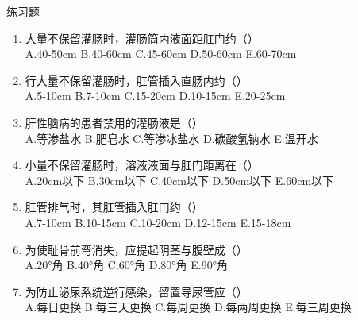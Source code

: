 \documentclass[11pt, a4paper]{ctexart}
\begin{document}
\begin{examplebox}{练习题}
\begin{enumerate}
		      A.200-500ml \quad B.250-600ml \quad C.300-800ml \quad D.500-1000ml \quad E.1000-1500ml
		\item 大量不保留灌肠时，灌肠筒内液面距肛门约（\qquad）\\
		      A.40-50cm \quad B.40-60cm \quad C.45-60cm \quad D.50-60cm \quad E.60-70cm
		\item 行大量不保留灌肠时，肛管插入直肠内约（\qquad）\\
		      A.5-10cm \quad B.7-10cm \quad C.15-20cm \quad D.10-15cm \quad E.20-25cm
		\item 肝性脑病的患者禁用的灌肠液是（\qquad）\\
		      A.等渗盐水 \quad B.肥皂水 \quad C.等渗冰盐水 \quad D.碳酸氢钠水 \quad E.温开水
		\item 小量不保留灌肠时，溶液液面与肛门距离在（\qquad）\\
		      A.20cm以下 \quad B.30cm以下 \quad C.40cm以下 \quad D.50cm以下 \quad E.60cm以下
		\item 肛管排气时，其肛管插入肛门约（\qquad）\\
		      A.7-10cm \quad B.10-15cm \quad C.10-20cm \quad D.12-15cm \quad E.15-18cm
		\item 为使耻骨前弯消失，应提起阴茎与腹壁成（\qquad）\\
		      A.20°角 \quad B.40°角 \quad C.60°角 \quad D.80°角 \quad E.90°角
		\item 为防止泌尿系统逆行感染，留置导尿管应（\qquad）\\
		      A.每日更换 \quad B.每三天更换 \quad C.每周更换 \quad D.每两周更换 \quad E.每三周更换
	\end{enumerate}
\end{examplebox}
\end{document}
